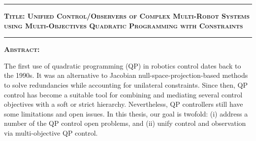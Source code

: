 \thispagestyle{empty}



\noindent \hrule\vspace{3pt}
\par\nobreak
\noindent\textbf{\textsc{Title: Unified Control/Observers of Complex Multi-Robot Systems using Multi-Objectives Quadratic Programming with Constraints}}
\noindent \vspace{3pt}\hrule\vspace{3pt}
\noindent
\textbf{\textsc{Abstract:}}

\noindent
The first use of quadratic programming (QP) in robotics control dates back to the 1990s. It was an alternative to Jacobian null-space-projection-based methods to solve redundancies while accounting for unilateral constraints. Since then, QP control has become a suitable tool for combining and mediating several control objectives with a soft or strict hierarchy. Nevertheless, QP controllers still have some limitations and open issues. In this thesis, our goal is twofold: (i) address a number of the QP control open problems, and (ii) unify control and observation via multi-objective QP control.

